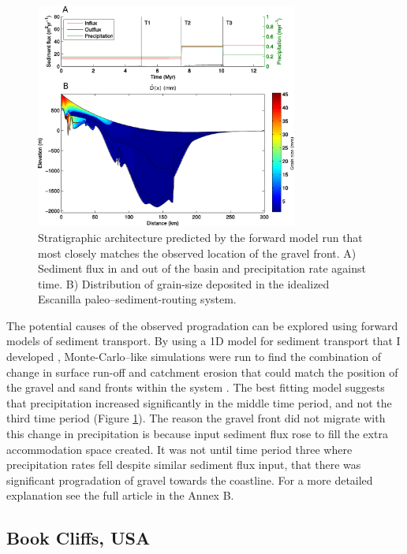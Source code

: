 \begin{figure}
\centering
\includegraphics[width=8.6cm]{./figures/ch2-escanilla-model.pdf}
\caption{Stratigraphic architecture predicted by the forward model run that most closely matches the observed location of the gravel front. A) Sediment flux in and out of the basin and precipitation rate against time. B) Distribution of grain-size deposited in the idealized Escanilla paleo--sediment-routing system.}
\label{fg:escanilla-model}
\end{figure}

The potential causes of the observed progradation can be explored using forward models of sediment transport. By using a 1D model for sediment transport that I developed \citep{armitage-etal-ngeo-2011}, Monte-Carlo--like simulations were run to find the combination of change in surface run-off and catchment erosion that could match the position of the gravel and sand fronts within the system \citep{armitage-etal-2015}. The best fitting model suggests that precipitation increased significantly in the middle time period, and not the third time period (Figure \ref{fg:escanilla-model}). The reason the gravel front did not migrate with this change in precipitation is because input sediment flux rose to fill the extra accommodation space created. It was not until time period three where precipitation rates fell despite similar sediment flux input, that there was significant progradation of gravel towards the coastline. For a more detailed explanation see the full article in the Annex B.

\subsection{Book Cliffs, USA}

